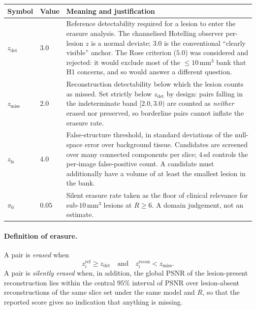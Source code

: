 \documentclass[11pt,a4paper]{article}
\begin{document}
\begin{center}
\begin{tabular}{llp{8.4cm}}
\toprule
\textbf{Symbol} & \textbf{Value} & \textbf{Meaning and justification} \\
\midrule
$z_{\mathrm{det}}$ & $3.0$ &
Reference detectability required for a lesion to enter the erasure analysis.
The channelised Hotelling observer per-lesion $z$ is a normal deviate; $3.0$
is the conventional ``clearly visible'' anchor. The Rose criterion ($5.0$) was
considered and rejected: it would exclude most of the $\le 10\,\mathrm{mm}^3$
bank that H1 concerns, and so would answer a different question. \\
\addlinespace
$z_{\mathrm{miss}}$ & $2.0$ &
Reconstruction detectability below which the lesion counts as missed. Set
strictly below $z_{\mathrm{det}}$ by design: pairs falling in the
indeterminate band $[2.0, 3.0)$ are counted as \emph{neither} erased nor
preserved, so borderline pairs cannot inflate the erasure rate. \\
\addlinespace
$z_{\mathrm{fs}}$ & $4.0$ &
False-structure threshold, in standard deviations of the null-space error over
background tissue. Candidates are screened over many connected components per
slice; $4$\,sd controls the per-image false-positive count. A candidate must
additionally have a volume of at least the smallest lesion in the bank. \\
\addlinespace
$\pi_0$ & $0.05$ &
Silent erasure rate taken as the floor of clinical relevance for sub-$10\,
\mathrm{mm}^3$ lesions at $R \ge 6$. A domain judgement, not an estimate. \\
\bottomrule
\end{tabular}
\end{center}

\paragraph{Definition of erasure.} A pair is \emph{erased} when
\begin{equation}
z_i^{\mathrm{ref}} \ge z_{\mathrm{det}}
\quad\text{and}\quad
z_i^{\mathrm{recon}} < z_{\mathrm{miss}} .
\end{equation}
A pair is \emph{silently erased} when, in addition, the global PSNR of the
lesion-present reconstruction lies within the central $95\%$ interval of PSNR
over lesion-absent reconstructions of the same slice set under the same model
and $R$, so that the reported score gives no indication that anything is
missing.
\end{document}
